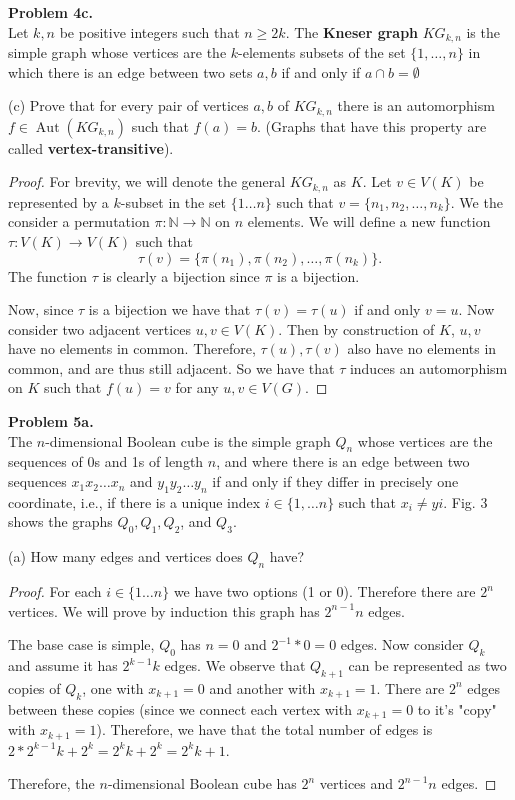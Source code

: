 \documentclass{article}
\newcommand{\N}{\mathbb{N}}
\newcommand{\set}[1]{\{#1\}}
\DeclareMathOperator*{\Aut}{Aut}
\newenvironment{hwproof}[2]
{
    \textbf{Problem #1.}\\
    #2
    \begin{proof}
}{
    \end{proof}
    \newpage
}
\begin{document}
\begin{hwproof}
    {4c}
    {
        Let $k, n$ be positive integers such that $n \geq 2k$. The \textbf{Kneser graph}
        $KG_{k,n}$ is the simple graph whose vertices are the $k$-elements subsets of
        the set $\set{1,\dots,n}$ in which there is an edge between two sets $a,b$
        if and only if $a\cap b = \emptyset$

        (c) Prove that for every pair of vertices $a,b$ of $KG_{k,n}$ there is an automorphism
        $f \in \Aut(KG_{k,n})$ such that $f(a) = b$. (Graphs that have this property are
        called \textbf{vertex-transitive}).
    }
    For brevity, we will denote the general $KG_{k,n}$ as $K$.
    Let $v \in V(K)$ be represented by a $k$-subset in the set $\set{1\dots n}$
    such that $v = \set{n_1, n_2, \dots, n_k}$.
    We the consider a permutation $\pi: \N \to \N$ on $n$ elements. We will define
    a new function $\tau: V(K) \to V(K)$ such that
    \[\tau(v) = \set{\pi(n_1), \pi(n_2),\dots, \pi(n_k)}.\]
    The function $\tau$ is clearly a bijection since $\pi$ is a bijection.

    Now, since $\tau$ is a bijection we have that $\tau(v) = \tau(u)$ if and only
    $v = u$. Now consider two adjacent vertices $u,v \in V(K)$. Then by construction
    of $K$, $u,v$ have no elements in common. Therefore, $\tau(u), \tau(v)$ also
    have no elements in common, and are thus still adjacent. So we have that
    $\tau$ induces an automorphism on $K$ such that $f(u) = v$ for any
    $u, v \in V(G)$.
\end{hwproof}

\begin{hwproof}
    {5a}
    {
        The $n$-dimensional Boolean cube is the simple graph $Q_n$ whose vertices are the
        sequences of 0s and 1s of length $n$, and where there is an edge between two sequences
        $x_1x_2\dots x_n$ and $y_1y_2\dots y_n$ if and only if they differ in precisely
        one coordinate, i.e., if there is a unique index $i \in \set{1,\dots n}$ such that
        $x_i \neq yi$. Fig. 3 shows the graphs $Q_0, Q_1, Q_2$, and $Q_3$.

        (a) How many edges and vertices does $Q_n$ have?
    }
    For each $i \in \set{1\dots n}$ we have two options (1 or 0). Therefore there are
    $2^n$ vertices. We will prove by induction this graph has $2^{n-1}n$ edges.

    The base case is simple, $Q_0$ has $n=0$ and $2^{-1}*0 = 0$ edges. Now consider $Q_k$ and
    assume it has $2^{k - 1}k$ edges. We observe that $Q_{k + 1}$ can be represented as
    two copies of $Q_k$, one with $x_{k + 1} = 0$ and another with $x_{k + 1} = 1$.
    There are $2^n$ edges between these copies (since we connect each vertex with
    $x_{k + 1} = 0$ to it's "copy" with $x_{k + 1} = 1$). Therefore, we have that
    the total number of edges is $2*2^{k-1}k + 2^k = 2^kk + 2^k = 2^k{k + 1}$.

    Therefore, the $n$-dimensional Boolean cube has $2^n$ vertices and $2^{n-1}n$ edges.
\end{hwproof}
\end{document}

